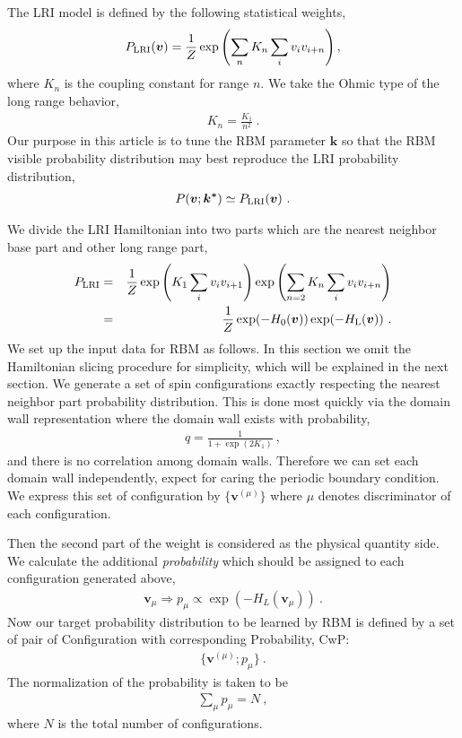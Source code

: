 \documentclass[a4paper,preprint,superscriptaddress,preprintnumbers,nofootinbib]{revtex4}
\newcommand{\Be}{\begin{eqnarray}}
\newcommand{\Ee}{\end{eqnarray}}
\begin{document}
The LRI model is defined by the following 
statistical weights,
\Be
P_{\rm LRI} (\bm{v})=\frac{1}{Z}\exp\left(\sum_n K_n\sum_i v_i v_{i+n}
\right)  ,
\Ee
where $K_n$ is the coupling constant for range $n$.
We take the Ohmic type of the long range behavior,
\Be
K_n = \frac{K_1}{n^2} \ .
\Ee
Our purpose in this article is to tune the RBM parameter $\bm{k}$ 
so that the RBM visible probability
distribution may best reproduce the LRI probability distribution, 
\Be
P(\bm{v};\bm{k^*}) \simeq P_{\rm LRI}(\bm{v})\ .
\Ee

We divide the LRI Hamiltonian into two parts which are the nearest neighbor
base part and other long range part,
\Be
P_{\rm LRI}  &=& \frac{1}{Z} \exp\left( K_1\sum_i v_i v_{i+1}\right) 
\exp\left(\sum_{n=2} K_n\sum_i v_i v_{i+n}\right)\nonumber\\
&=& \frac{1}{Z} \exp(-H_0(\bm{v})) \exp(-H_{\rm L}(\bm{v}))\ .
\Ee
We set up the input data for RBM as follows.
In this section we omit the Hamiltonian slicing procedure for simplicity, 
which will be explained in the next section.
We generate a set of spin configurations exactly respecting the
nearest neighbor part probability distribution. 
This is done most quickly via the domain wall representation \cite{DWRG09} 
where the domain wall exists with probability,
\Be
q=\frac{1}{1+\exp(2K_1)}\ ,
\Ee
and there is no correlation among domain walls. Therefore we can
set each domain wall independently, expect for caring the periodic boundary condition.
We express this set of configuration by $\{\bm{v}^{(\mu)}\}$ 
where $\mu$ denotes discriminator of each configuration.

Then the second part of the weight is considered as the
physical quantity side. We calculate the additional {\sl probability} which should
be assigned to each configuration generated above,
\Be
\bm{v}_\mu \Longrightarrow p_\mu \propto \exp(-H_{L}(\bm{v}_\mu))\ .
\Ee
Now our target probability distribution to be learned by RBM 
is defined by a set of pair of
Configuration with corresponding Probability, CwP:
\Be
\{ \bm{v}^{(\mu)}; p_\mu\}\ .
\Ee
The normalization of the probability is taken to be 
\Be
\sum_\mu p_\mu = N\ ,
\Ee
where $N$ is the total number of configurations.
\end{document}
